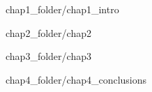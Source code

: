 \documentclass[a4paper,12pt,titlepage, onecolumn, twoside]{report}
\numberwithin{equation}{chapter}
\numberwithin{table}{chapter}
\numberwithin{figure}{chapter}
\begin{document}
\pagestyle {fancy}


\doublespacing


 {chap1_folder/chap1_intro}

 {chap2_folder/chap2}

 {chap3_folder/chap3}

 {chap4_folder/chap4_conclusions}

\newpage


\end{document}
